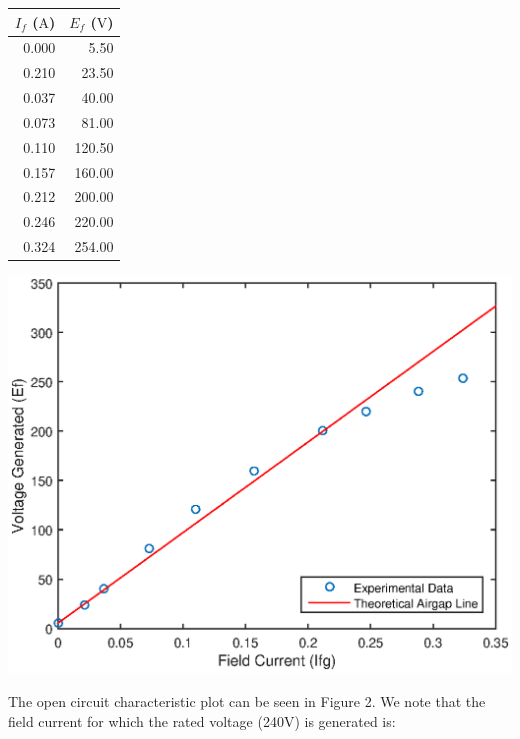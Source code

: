 \documentclass{article}
\begin{document}
 \begin{minipage}{\textwidth}
 	\begin{minipage}[b]{0.49\textwidth}
 		\centering
 		\begin{tabular}{rr}
 			\toprule
 			$I_f$ ($\si{\ampere}$) & $E_f$ ($\si{\volt}$)\\
 			\midrule
 			0.000 & 5.50 \\
 			0.210 & 23.50 \\
 			0.037 & 40.00 \\
 			0.073 & 81.00 \\
 			0.110 & 120.50 \\
 			0.157 & 160.00 \\
 			0.212 & 200.00 \\
 			0.246 & 220.00 \\
 			0.324 & 254.00 \\
 			\bottomrule
 		\end{tabular}
 	\end{minipage}
 	\hfill
 	\begin{minipage}[b]{0.49\textwidth}
 		\centering
 		\includegraphics[scale=0.45]{fig1}
 	\end{minipage}
 \end{minipage}
 
 \vspace{1cm}
 
 The open circuit characteristic plot can be seen in Figure 2. We note that the field current for which the rated voltage (240V) is generated is:
 \begin{center}
 \end{center}
 
\end{document}
